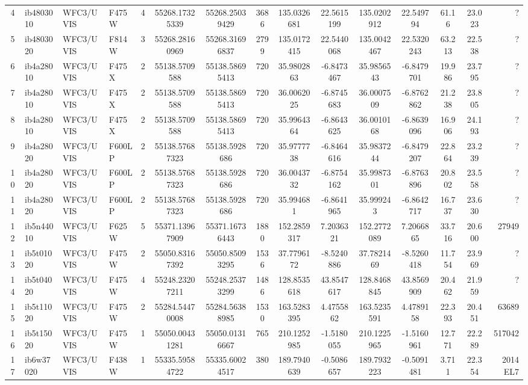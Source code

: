 \documentclass{aa}
\begin{document}
\begin{appendix}
\begin{landscape}
\begin{table}
\begin{tabular}{c l l l c c c c c c c c c c r}
4 & ib4803010 & WFC3/UVIS & F475W & 4 & 55268.17325339 & 55268.25039429 & 3686 & 135.0326681 & 22.5615199 & 135.0202912 & 22.549794 & 61.16 & 23.023 &  ? \\
5 & ib4803020 & WFC3/UVIS & F814W & 3 & 55268.28160969 & 55268.31696837 & 2799 & 135.0172415 & 22.5440068 & 135.0042467 & 22.5320243 & 63.213 & 22.538 &  ? \\
6 & ib4a28010 & WFC3/UVIS & F475X & 2 & 55138.5709588 & 55138.58695413 & 720 & 35.9802863 & -6.8473467 & 35.9856543 & -6.8479701 & 19.986 & 23.795 &  ? \\
7 & ib4a28010 & WFC3/UVIS & F475X & 2 & 55138.5709588 & 55138.58695413 & 720 & 36.0062025 & -6.8745683 & 36.0007509 & -6.8762862 & 21.238 & 23.805 &  ? \\
8 & ib4a28010 & WFC3/UVIS & F475X & 2 & 55138.5709588 & 55138.58695413 & 720 & 35.9964364 & -6.8643625 & 36.0010168 & -6.8639096 & 16.906 & 24.193 &  ? \\
9 & ib4a28020 & WFC3/UVIS & F600LP & 2 & 55138.57687323 & 55138.5928686 & 720 & 35.9777738 & -6.8464616 & 35.9837244 & -6.8479207 & 22.864 & 23.239 &  ? \\
10 & ib4a28020 & WFC3/UVIS & F600LP & 2 & 55138.57687323 & 55138.5928686 & 720 & 36.0043732 & -6.8754162 & 35.9987301 & -6.8763896 & 20.802 & 23.558 &  ? \\
11 & ib4a28020 & WFC3/UVIS & F600LP & 2 & 55138.57687323 & 55138.5928686 & 720 & 35.994681 & -6.8641965 & 35.999243 & -6.8642717 & 16.737 & 23.630 &  ? \\
12 & ib5n44010 & WFC3/UVIS & F625W & 5 & 55371.13967909 & 55371.16736443 & 1880 & 152.2859317 & 7.2036321 & 152.2772089 & 7.2066865 & 33.716 & 20.600 & 27949 \\
13 & ib5t01020 & WFC3/UVIS & F475W & 2 & 55050.83167392 & 55050.85093295 & 1536 & 37.7796172 & -8.5240886 & 37.7821469 & -8.5260418 & 11.754 & 23.969 &  ? \\
14 & ib5t04020 & WFC3/UVIS & F475W & 4 & 55248.23207211 & 55248.25373299 & 1486 & 128.8535618 & 43.8547617 & 128.8468845 & 43.8569909 & 20.462 & 21.959 &  ? \\
15 & ib5t11020 & WFC3/UVIS & F475W & 2 & 55284.54470008 & 55284.56388985 & 1530 & 163.5283395 & 4.4755862 & 163.5235591 & 4.4789158 & 22.393 & 20.451 & 63689 \\
16 & ib5t15020 & WFC3/UVIS & F475W & 1 & 55050.00431281 & 55050.01316667 & 765 & 210.1252985 & -1.5180055 & 210.1225965 & -1.5160961 & 12.771 & 22.289 & 517042 \\
17 & ib6w37020 & WFC3/UVIS & F438W & 1 & 55335.59584722 & 55335.60024517 & 380 & 189.7940639 & -0.5086657 & 189.7932223 & -0.5091481 & 3.711 & 22.354 & 2014 EL7 \\

\end{tabular}
\end{table}
\end{landscape}
\end{appendix}
\end{document}
